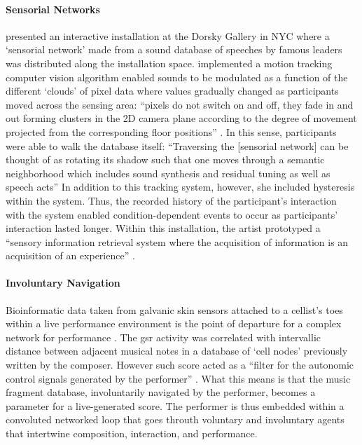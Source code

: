 	\paragraph{Sensorial Networks}
	\textcite{Cho00:Voi, icmc/bbp2372.2000.146} presented an interactive installation at the Dorsky Gallery in NYC where a `sensorial network' made from a sound database of speeches by famous leaders was distributed along the installation space. \citeauthor{icmc/bbp2372.2000.146} implemented a motion tracking computer vision algorithm enabled sounds to be modulated as a function of the different `clouds' of pixel data where values gradually changed as participants moved across the sensing area: ``pixels do not switch on and off, they fade in and out forming clusters in the 2D camera plane according to the degree of movement projected from the corresponding floor positions'' \parencite[4]{icmc/bbp2372.2000.146}. In this sense, participants were able to walk the database itself: ``Traversing the [sensorial network] can be thought of as rotating its shadow such that one moves through a semantic neighborhood which includes sound synthesis and residual tuning as well as speech acts'' \parencite[3]{icmc/bbp2372.2000.146}	In addition to this tracking system, however, she included hysteresis within the system. Thus, the recorded history of the participant's interaction with the system enabled condition-dependent events to occur as participants' interaction lasted longer. Within this installation, the artist prototyped a ``sensory information retrieval system where the acquisition of information is an acquisition of an experience'' \parencite[1]{icmc/bbp2372.2000.146}.

	\paragraph{Involuntary Navigation}
	Bioinformatic data taken from galvanic skin sensors attached to a cellist's toes within a live performance environment is the point of departure for a complex network for performance \parencite{icmc/bbp2372.2006.123}. The \gls{gsr} activity was correlated with intervallic distance between adjacent musical notes in a database of `cell nodes' previously written by the composer. However such score acted as a ``filter for the autonomic control signals generated by the performer'' \parencite[601]{icmc/bbp2372.2006.123}. What this means is that the music fragment database, involuntarily navigated by the performer, becomes a parameter for a live-generated score. The performer is thus embedded within a convoluted networked loop that goes throuth voluntary and involuntary agents that intertwine composition, interaction, and performance.

